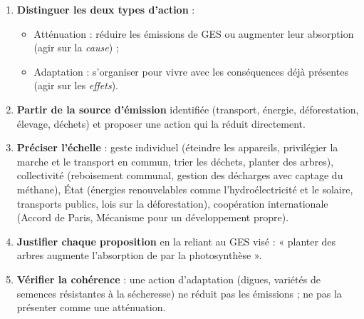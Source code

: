 \documentclass[11pt]{article}
\newcommand{\cle}[1]{{\popxbold\color{popdark}#1}}
\begin{document}
\begin{methode}
\begin{enumerate}
\item \textbf{Distinguer les deux types d'action} :
\begin{itemize}
\item \cle{Atténuation} : réduire les émissions de GES ou augmenter leur absorption (agir sur la \emph{cause}) ;
\item \cle{Adaptation} : s'organiser pour vivre avec les conséquences déjà présentes (agir sur les \emph{effets}).
\end{itemize}
\item \textbf{Partir de la source d'émission} identifiée (transport, énergie, déforestation, élevage, déchets) et proposer une action qui la réduit directement.
\item \textbf{Préciser l'échelle} : geste individuel (éteindre les appareils, privilégier la marche et le transport en commun, trier les déchets, planter des arbres), collectivité (reboisement communal, gestion des décharges avec captage du méthane), État (énergies renouvelables comme l'hydroélectricité et le solaire, transports publics, lois sur la déforestation), coopération internationale (Accord de Paris, Mécanisme pour un développement propre).
\item \textbf{Justifier chaque proposition} en la reliant au GES visé : « planter des arbres augmente l'absorption de  par la photosynthèse ».
\item \textbf{Vérifier la cohérence} : une action d'adaptation (digues, variétés de semences résistantes à la sécheresse) ne réduit pas les émissions ; ne pas la présenter comme une atténuation.
\end{enumerate}
\end{methode}
\end{document}
